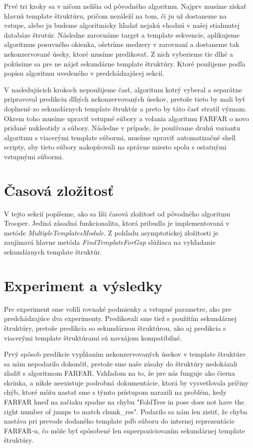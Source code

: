 \indent Prvé tri kroky sa v ničom nelíšia od pôvodného algoritmu. Najprv musíme získať hlavnú template štruktúru, pričom nezáleží na tom, či ju už dostaneme na vstupe, alebo ju budeme algoritmicky hľadať  nejakú vhodnú v našej stiahnutej databáze štrutúr. Následne zarovnáme target a template sekvencie, aplikujeme algoritmus posuvného okienka, ošetríme medzery v zarovnaní a dostaneme tak nekonzervované úseky, ktoré musíme predikovať. Z nich vyberieme tie dlhé a pokúsime sa pre ne nájsť sekundárne template štruktúry. Ktoré použijeme podľa popisu algoritmu uvedeného v predchádzajúcej sekcií.


\indent V nasledujúcich krokoch nepoužijeme časť, algoritmu kotrý vyberal a separátne pripravoval predikciu dlhých nekonzervovaných úsekov, pretože tieto by mali byť doplnené zo sekundárnych template štruktúr a preto by táto časť stratil význam. Okrem toho musíme upraviť vstupné súbory a volania algoritmu FARFAR o novo pridané nukleotidy a súbory. Následne v prípade, že používame druhú variantu algoritmu s viacerými template súbormi, musíme upraviť automatizačné shell scripty, aby tieto súbory nakopírovali na správne miesto spolu s ostatnými vstupnými súbormi.


\section{Časová zložitosť} 
V tejto sekcií popíšeme, ako sa líši časová zložitosť od pôvodného algoritmu Trooper. Jediná zásadná funkcionalita, ktorá pribudla je implementovaná v metóde \textit{MultipleTemplatesModule}.
Z pohľadu asymptotickej zložitosti je zaujímavá hlavne metóda  \textit{FindTemplateForGap} slúžiaca na vyhľadanie sekundárnych template štruktúr.

\section{Experiment a výsledky} 
Pre experiment sme volili rovnaké podmienky a vstupné parametre, ako pre predchádzajúce dva experimenty. Predikovali sme tiež s použitím sekundárnej štruktúry, pretože predikcia so sekundárnou štruktúrou, ako aj predikcia s viacerými template štruktúrami sú navzájom kompatibilné.


\indent Prvý spôsob predikcie vypĺňaním nekonzervovaných úsekov v template štruktúre sa nám nepodarilo dokončiť, pretože sme naše zásahy do štruktúry nedokázali zladiť s algoritmom FARFAR. Vzhľadom na to, že pre nás funguje ako čierna skrinka, a nikde neexistuje podrobná dokumentácie, ktorá by vysvetľovala príčiny chýb, ktoré môžu nastať sme s týmto prístupom narazili na problém, kedy FARFAR hneď na začiaku spadne na chybu "FoldTree in pose does not have the right number of jumps to match chunk\_res". Podarilo sa nám len zistiť, že chyba nastáva pri prevode dodaného template pdb súboru do internej reprezentácie FARFAR-u, čo môže byť spôsobené len superpoziciovaním sekundárnej template štruktúry.


